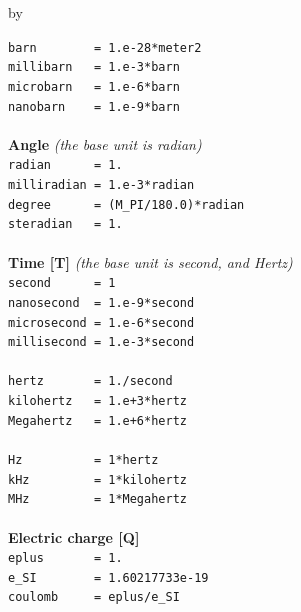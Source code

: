 \documentclass[twoside]{article}
\newcommand{\entrylabel}[1]{\mbox{\textbf{{#1}}}\hfil}%
\newenvironment{entry}
{\begin{list}{}%
    {\renewcommand{\makelabel}{\entrylabel}%
     \setlength{\labelwidth}{90pt}%
     \setlength{\leftmargin}{\labelwidth}
     \advance\leftmargin by \labelsep%
      }%
    }%
  {\end{list}}
\newcommand{\Entrylabel}[1]%
{\raisebox{0pt}[1ex][0pt]{\makebox[\labelwidth][l]%
    {\parbox[t]{\labelwidth}{\hspace{0pt}\textbf{{#1}}}}}}
\newenvironment{Entry}%
{\renewcommand{\entrylabel}{\Entrylabel}\begin{entry}}%
  {\end{entry}}
\begin{document}
\begin{description}
\begin{Entry}
  \verb+barn        = 1.e-28*meter2+ \\           
  \verb+millibarn   = 1.e-3*barn+ \\  
  \verb+microbarn   = 1.e-6*barn+ \\
  \verb+nanobarn    = 1.e-9*barn+ \\ \\ 
{\bf Angle} {\it (the base unit is radian)}\\
  \verb+radian      = 1.+  \\ 
  \verb+milliradian = 1.e-3*radian+ \\ 
  \verb+degree      = (M_PI/180.0)*radian+ \\
  \verb+steradian   = 1. +\\ \\
{\bf Time [T]} {\it (the base unit is second, and Hertz)}\\
  \verb#second      = 1# \\
  \verb+nanosecond  = 1.e-9*second+\\ 
  \verb+microsecond = 1.e-6*second+\\ 
  \verb+millisecond = 1.e-3*second+ \\ \\ 
  \verb+hertz       = 1./second+ \\ 
  \verb#kilohertz   = 1.e+3*hertz# \\
  \verb#Megahertz   = 1.e+6*hertz# \\ \\
  \verb+Hz          = 1*hertz+ \\ 
  \verb#kHz         = 1*kilohertz# \\
  \verb#MHz         = 1*Megahertz# \\ \\
{\bf Electric charge [Q]} \\
  \verb+eplus       = 1.+ \\
  \verb+e_SI        = 1.60217733e-19+ \\
  \verb+coulomb     = eplus/e_SI+ \\
  

\end{Entry}
\end{description}
\end{document}

